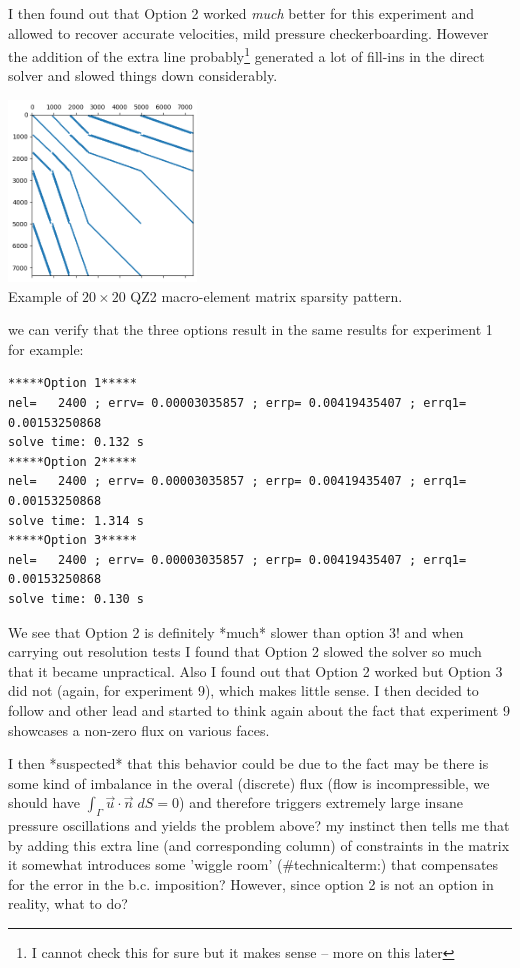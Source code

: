 I then found out that Option 2 worked {\it much} better for this experiment
and allowed to recover accurate velocities, mild pressure checkerboarding.
However the addition of the extra line probably\footnote{I cannot check this 
for sure but it makes sense -- more on this later} generated a lot of fill-ins in the direct solver
and slowed things down considerably.

\begin{center}
\includegraphics[width=5cm]{python_codes/fieldstone_78/images/lagrange/A_bef.png}\\
{\captionfont Example of $20\times 20$ QZ2 macro-element matrix sparsity pattern.}
\end{center}

we can verify that the three options result in the same results 
for experiment 1 for example:

{\small
\begin{verbatim}
*****Option 1*****
nel=   2400 ; errv= 0.00003035857 ; errp= 0.00419435407 ; errq1= 0.00153250868 
solve time: 0.132 s
*****Option 2*****
nel=   2400 ; errv= 0.00003035857 ; errp= 0.00419435407 ; errq1= 0.00153250868 
solve time: 1.314 s
*****Option 3*****
nel=   2400 ; errv= 0.00003035857 ; errp= 0.00419435407 ; errq1= 0.00153250868 
solve time: 0.130 s
\end{verbatim}
}

We see that Option 2 is definitely *much* slower than option 3!
and when carrying out resolution tests I found that Option 2 slowed 
the solver so much that it became unpractical. 
Also I found out that Option 2 worked but Option 3 did not (again, for experiment 9), which makes little sense. 
I then decided to follow and other lead and started to think again about the fact that 
experiment 9 showcases a non-zero flux on various faces. 

I then *suspected* that this behavior could be due to the fact 
may be there is some kind of imbalance in the overal (discrete)
flux (flow is incompressible, we should have $\int_\Gamma \vec{u}\cdot\vec{n} \; dS=0$) 
and therefore triggers extremely large insane pressure oscillations and 
yields the problem above? my instinct then tells me that 
by adding this extra line (and corresponding column) of constraints in the matrix it somewhat 
introduces some 'wiggle room' (\#technicalterm:) that compensates for the error in the b.c. imposition?
However, since option 2 is not an option in reality, what to do? 
 
